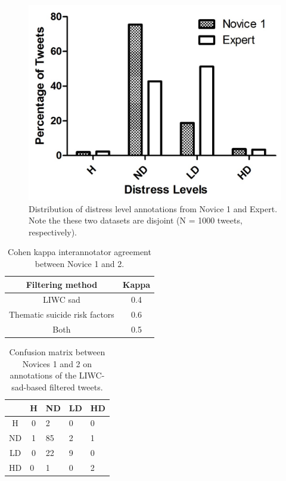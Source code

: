 \documentclass[11pt]{article}
\begin{document}
\begin{figure}
\centering
\includegraphics[scale=0.65]{ChrisMegan4Cat.jpg}
\caption{Distribution of distress level annotations from Novice 1 and Expert. Note the these two datasets are disjoint (N = 1000 tweets, respectively).}
\label{fig:distress-distrib2}
\end{figure}




\begin{table}[h]
 \centering
\begin{tabular}{|c|c|}
\hline
\textbf{Filtering method}                    & \textbf{Kappa}  \\ \hline
LIWC sad              & 0.4 \\ \hline
Thematic suicide risk factors& 0.6 \\ \hline
Both               & 0.5 \\ \hline
\end{tabular}
\caption {Cohen kappa interannotator agreement between Novice 1 and 2.}
\label{tab:kappa}
\end{table}


\begin{table}[h]
\centering
\begin{tabular}{c|c|l||l|l|}
\cline{2-5}
                         & H                       & ND & LD & HD \\ \hline
\multicolumn{1}{|c|}{H}  & 0                       & 2  & 0  & 0  \\ \hline
\multicolumn{1}{|c|}{ND} & 1                       & 85 & 2  & 1  \\ \hline \hline
\multicolumn{1}{|c|}{LD} & 0                       & 22 & 9  & 0  \\ \hline
\multicolumn{1}{|l}{HD}  & \multicolumn{1}{|l|}{0} & 1  & 0  & 2  \\ \hline
\end{tabular}
\caption {Confusion matrix between Novices 1 and 2 on annotations of the LIWC-sad-based filtered tweets.}
\label{tab:liwc-conf}
\end{table}
\end{document}
